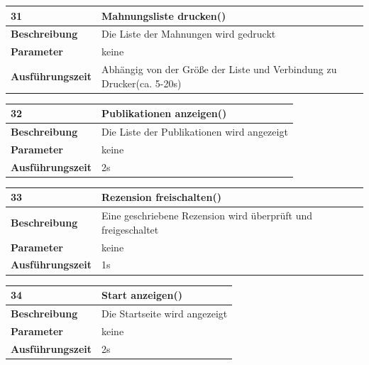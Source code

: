 \documentclass[fontsize=12pt,paper=a4,twoside]{scrartcl}
\begin{document}
\begin{table}
	[H] \label{a31} 
	\begin{tabular}
		{|l|p{10cm}|} \hline \textbf{31} & \textbf{Mahnungsliste drucken()} \\
		\hline \textbf{Beschreibung} & Die Liste der Mahnungen wird gedruckt\\
		\hline \textbf{Parameter} & keine \\
		\hline \textbf{Ausführungszeit} & Abhängig von der Größe der Liste und Verbindung zu Drucker(ca. 5-20s)\\
		\hline 
	\end{tabular}
\end{table}
\begin{table}
	[H] \label{a32} 
	\begin{tabular}
		{|l|p{10cm}|} \hline \textbf{32} & \textbf{Publikationen anzeigen()} \\
		\hline \textbf{Beschreibung} & Die Liste der Publikationen wird angezeigt\\
		\hline \textbf{Parameter} & keine \\
		\hline \textbf{Ausführungszeit} & 2s\\
		\hline 
	\end{tabular}
\end{table}
\begin{table}
	[H] \label{a33} 
	\begin{tabular}
		{|l|p{10cm}|} \hline \textbf{33} & \textbf{Rezension freischalten()} \\
		\hline \textbf{Beschreibung} & Eine geschriebene Rezension wird überprüft und freigeschaltet\\
		\hline \textbf{Parameter} & keine \\
		\hline \textbf{Ausführungszeit} & 1s\\
		\hline 
	\end{tabular}
\end{table}
\begin{table}
	[H] \label{a34} 
	\begin{tabular}
		{|l|p{10cm}|} \hline \textbf{34} & \textbf{Start anzeigen()} \\
		\hline \textbf{Beschreibung} & Die Startseite wird angezeigt\\
		\hline \textbf{Parameter} & keine \\
		\hline \textbf{Ausführungszeit} & 2s\\
		\hline 
	\end{tabular}
\end{table}
\end{document}
